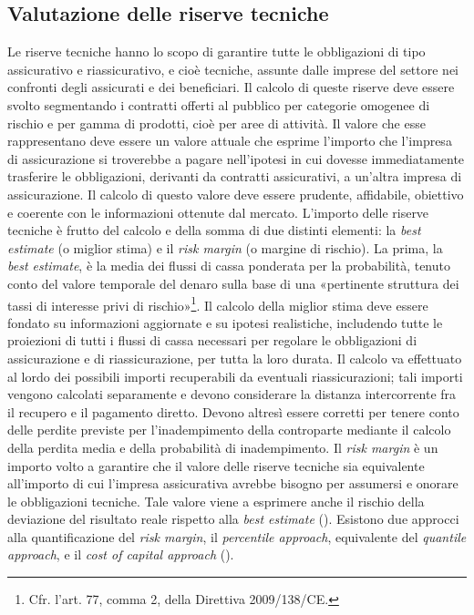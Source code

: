 \subsection{Valutazione delle riserve tecniche}
Le riserve tecniche hanno lo scopo di garantire tutte le obbligazioni di tipo assicurativo e riassicurativo, e cioè tecniche, assunte dalle imprese del settore nei confronti degli assicurati e dei beneficiari. Il calcolo di queste riserve deve essere svolto segmentando i contratti offerti al pubblico per categorie omogenee di rischio e per gamma di prodotti, cioè per aree di attività.
Il valore che esse rappresentano deve essere un valore attuale che esprime l’importo che l’impresa di assicurazione si troverebbe a pagare nell’ipotesi in cui dovesse immediatamente trasferire le obbligazioni, derivanti da contratti assicurativi, a un’altra impresa di assicurazione. Il calcolo di questo valore deve essere prudente, affidabile, obiettivo e coerente con le informazioni ottenute dal mercato.
L’importo delle riserve tecniche è frutto del calcolo e della somma di due distinti elementi: la {\itshape best estimate} (o miglior stima) e il {\itshape risk margin} (o margine di rischio).
La prima, la {\itshape best estimate}, è la media dei flussi di cassa ponderata per la probabilità, tenuto conto del valore temporale del denaro sulla base di una «pertinente struttura dei tassi di interesse privi di rischio»\footnote{Cfr. l’art. 77, comma 2, della Direttiva 2009/138/CE.}. Il calcolo della miglior stima deve essere fondato su informazioni aggiornate e su ipotesi realistiche, includendo tutte le proiezioni di tutti i flussi di cassa necessari per regolare le obbligazioni di assicurazione e di riassicurazione, per tutta la loro durata. Il calcolo va effettuato al lordo dei possibili importi recuperabili da eventuali riassicurazioni; tali importi vengono calcolati separamente e devono considerare la distanza intercorrente fra il recupero e il pagamento diretto. Devono altresì essere corretti per tenere conto delle perdite previste per l’inadempimento della controparte mediante il calcolo della perdita media e della probabilità di inadempimento.
Il {\itshape risk margin} è un importo volto a garantire che il valore delle riserve tecniche sia equivalente all’importo di cui l’impresa assicurativa avrebbe bisogno per assumersi e onorare le obbligazioni tecniche. Tale valore viene a esprimere anche il rischio della deviazione del risultato reale rispetto alla {\itshape best estimate} (\cite[pp. 19 et 47-49]{ceaglossary}).
Esistono due approcci alla quantificazione del {\itshape risk margin}, il {\itshape percentile approach}, equivalente del {\itshape quantile approach}, e il {\itshape cost of capital approach} (\cite[p. 13]{eiopal2riskmargin}).
